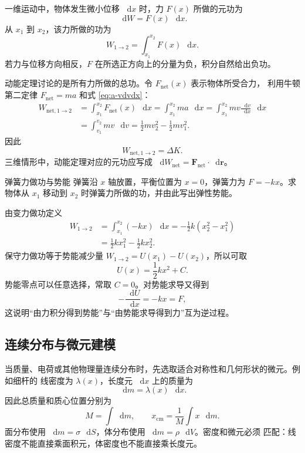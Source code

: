 \documentclass[UTF8,zihao=-4,oneside,openany]{ctexbook}
\numberwithin{equation}{section}
\newcommand{\dd}{\mathop{}\!\mathrm{d}}
\newcommand{\vect}[1]{\bm{#1}}
\begin{document}
一维运动中，物体发生微小位移 $\dd x$ 时，力 $F(x)$ 所做的元功为
\[
  \dd W=F(x)\,\dd x.
\]
从 $x_1$ 到 $x_2$，该力所做的功为
\begin{equation}
  W_{1\to2}=\int_{x_1}^{x_2}F(x)\,\dd x.
  \label{eq:variable-force-work}
\end{equation}
若力与位移方向相反，$F$ 在所选正方向上的分量为负，积分自然给出负功。

动能定理讨论的是所有力所做的总功。令 $F_{\mathrm{net}}(x)$ 表示物体所受合力，
利用牛顿第二定律 $F_{\mathrm{net}}=ma$ 和式 \eqref{eq:a-vdvdx}：
\begin{align*}
  W_{\mathrm{net},1\to2}
  &=\int_{x_1}^{x_2}F_{\mathrm{net}}(x)\,\dd x
  =\int_{x_1}^{x_2}ma\,\dd x
  =\int_{x_1}^{x_2}m v\frac{\dd v}{\dd x}\,\dd x\\
  &=\int_{v_1}^{v_2}mv\,\dd v
  =\frac12mv_2^2-\frac12mv_1^2.
\end{align*}
因此
\begin{equation}
  W_{\mathrm{net},1\to2}=\Delta K.
  \label{eq:work-energy-theorem}
\end{equation}
三维情形中，动能定理对应的元功应写成
$\dd W_{\mathrm{net}}=\vect F_{\mathrm{net}}\cdot\dd\vect r$。

\begin{examplebox}{弹簧力做功与势能}
弹簧沿 $x$ 轴放置，平衡位置为 $x=0$，弹簧力为 $F=-kx$。求物体从 $x_1$
移动到 $x_2$ 时弹簧力所做的功，并由此写出弹性势能。

\tcblower
由变力做功定义
\begin{align*}
  W_{1\to2}
  &=\int_{x_1}^{x_2}(-kx)\,\dd x
  =-\frac12k(x_2^2-x_1^2)\\
  &=\frac12kx_1^2-\frac12kx_2^2.
\end{align*}
保守力做功等于势能减少量 $W_{1\to2}=U(x_1)-U(x_2)$，所以可取
\begin{equation}
  U(x)=\frac12kx^2+C.
  \label{eq:spring-potential}
\end{equation}
势能零点可以任意选择，常取 $C=0$。对势能求导又得到
\[
  -\frac{\dd U}{\dd x}=-kx=F,
\]
这说明“由力积分得到势能”与“由势能求导得到力”互为逆过程。
\end{examplebox}

\subsection{连续分布与微元建模}

当质量、电荷或其他物理量连续分布时，先选取适合对称性和几何形状的微元。例如细杆的
线密度为 $\lambda(x)$，长度元 $\dd x$ 上的质量为
\[
  \dd m=\lambda(x)\,\dd x.
\]
因此总质量和质心位置分别为
\begin{equation}
  M=\int\dd m,
  \qquad
  x_{\mathrm{cm}}=\frac1M\int x\,\dd m.
  \label{eq:continuous-center-of-mass}
\end{equation}
面分布使用 $\dd m=\sigma\,\dd S$，体分布使用 $\dd m=\rho\,\dd V$。密度和微元必须
匹配：线密度不能直接乘面积元，体密度也不能直接乘长度元。
\end{document}
